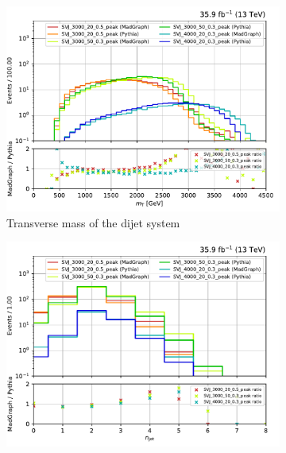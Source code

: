 \begin{figure}[htbp]
    \centering
    \begin{subfigure}[b]{0.49\textwidth}
        \includegraphics[width=\textwidth]{figures/madgraph_pythia_comparisons/plots/part2/dijet_mt.pdf}
        \caption{Transverse mass of the dijet system}
    \end{subfigure}
    \hfill
    \begin{subfigure}[b]{0.49\textwidth}
        \includegraphics[width=\textwidth]{figures/madgraph_pythia_comparisons/plots/part2/njet.pdf}
        \caption{\njet}
    \end{subfigure}


\end{figure}
